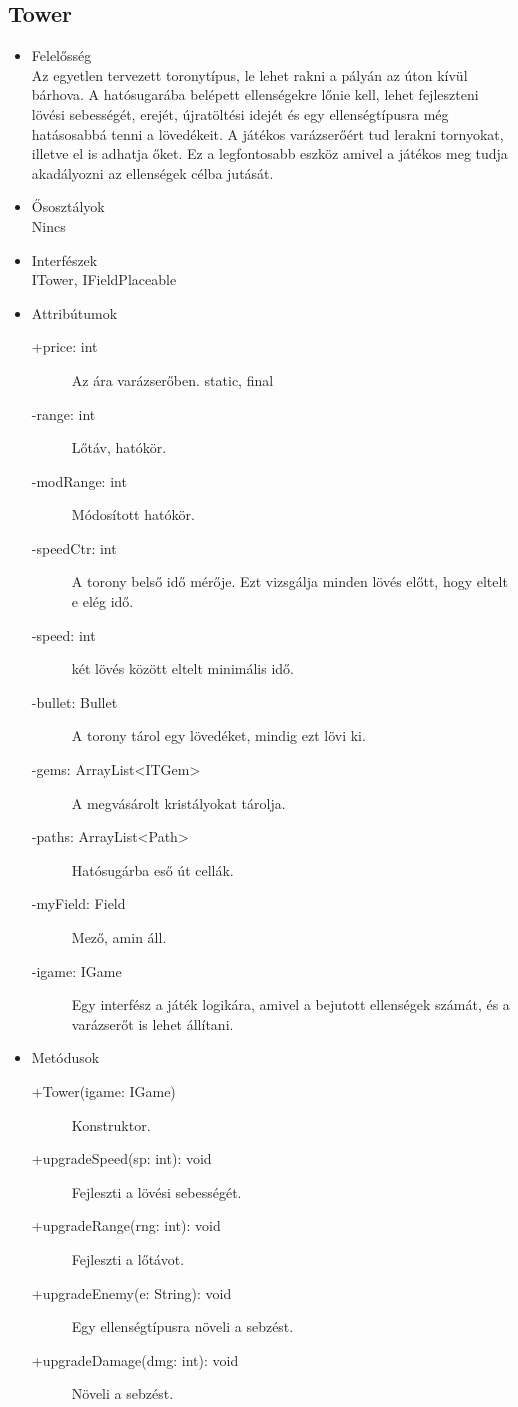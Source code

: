 \subsection{Tower}
\begin{itemize}
\item Felelősség\\
Az egyetlen tervezett toronytípus, le lehet rakni a pályán az úton kívül bárhova. A hatósugarába belépett ellenségekre lőnie kell, lehet fejleszteni lövési sebességét, erejét, újratöltési idejét és egy ellenségtípusra még hatásosabbá tenni a lövedékeit. A játékos varázserőért tud lerakni tornyokat, illetve el is adhatja őket. Ez a legfontosabb eszköz amivel a játékos meg tudja akadályozni az ellenségek célba jutását.
\item Ősosztályok\\
Nincs
\item Interfészek\\
ITower, IFieldPlaceable
\item Attribútumok\\
	\begin{description}
		\item[+price: int] Az ára varázserőben. static, final
\item[-range: int] Lőtáv, hatókör.
\item[-modRange: int] Módosított hatókör. 
\item[-speedCtr: int] A torony belső idő mérője. Ezt vizsgálja minden lövés előtt, hogy eltelt e elég idő. 
\item[-speed: int] két lövés között eltelt minimális idő. 
\item[-bullet: Bullet] A torony tárol egy lövedéket, mindig ezt lövi ki. 
\item[-gems: ArrayList<ITGem> ] A megvásárolt kristályokat tárolja.  
\item[-paths: ArrayList<Path>] Hatósugárba eső út cellák.   
\item[-myField: Field] Mező, amin áll. 
\item[-igame: IGame] Egy interfész a játék logikára, amivel a bejutott ellenségek számát, és a varázserőt is lehet állítani.  

	\end{description}
\item Metódusok\\
	\begin{description}
		\item[+Tower(igame: IGame)] Konstruktor. 
\item[+upgradeSpeed(sp: int): void] Fejleszti a lövési sebességét. 
\item[+upgradeRange(rng: int): void] Fejleszti a lőtávot. 
\item[+upgradeEnemy(e: String): void] Egy ellenségtípusra növeli a sebzést. 
\item[+upgradeDamage(dmg: int): void] Növeli a sebzést. 

		
		
	\end{description}
\end{itemize}
